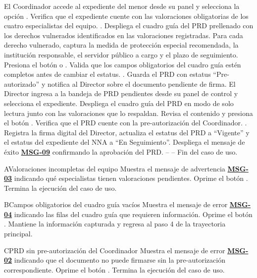 \begin{UCtrayectoria}
	\UCpaso[\UCactor] El Coordinador accede al expediente del menor desde su panel y selecciona la opción .
	\UCpaso Verifica que el expediente cuente con las valoraciones obligatorias de los cuatro especialistas del equipo. .
	\UCpaso Despliega el cuadro guía del PRD prellenado con los derechos vulnerados identificados en las valoraciones registradas.
	\UCpaso[\UCactor] Para cada derecho vulnerado, captura la medida de protección especial recomendada, la institución responsable, el servidor público a cargo y el plazo de seguimiento.
	\UCpaso[\UCactor] Presiona el botón  o .
	\UCpaso Valida que los campos obligatorios del cuadro guía estén completos antes de cambiar el estatus. .
	\UCpaso Guarda el PRD con estatus ``Pre-autorizado'' y notifica al Director sobre el documento pendiente de firma.
	\UCpaso[\UCactor] El Director ingresa a la bandeja de PRD pendientes desde su panel de control y selecciona el expediente.
	\UCpaso Despliega el cuadro guía del PRD en modo de solo lectura junto con las valoraciones que lo respaldan.
	\UCpaso[\UCactor] Revisa el contenido y presiona el botón .
	\UCpaso Verifica que el PRD cuente con la pre-autorización del Coordinador. .
	\UCpaso Registra la firma digital del Director, actualiza el estatus del PRD a ``Vigente'' y el estatus del expediente del NNA a ``En Seguimiento''.
	\UCpaso Despliega el mensaje de éxito \hyperlink{mMSG09}{\bf MSG-09} confirmando la aprobación del PRD.
	\UCpaso[] -- -- Fin del caso de uso.
\end{UCtrayectoria}

\begin{UCtrayectoriaA}{A}{Valoraciones incompletas del equipo}
	\UCpaso Muestra el mensaje de advertencia \hyperlink{mMSG03}{\bf MSG-03} indicando qué especialistas tienen valoraciones pendientes.
	\UCpaso[\UCactor] Oprime el botón .
	\UCpaso Termina la ejecución del caso de uso.
\end{UCtrayectoriaA}

\begin{UCtrayectoriaA}{B}{Campos obligatorios del cuadro guía vacíos}
	\UCpaso Muestra el mensaje de error \hyperlink{mMSG04}{\bf MSG-04} indicando las filas del cuadro guía que requieren información.
	\UCpaso[\UCactor] Oprime el botón .
	\UCpaso Mantiene la información capturada y regresa al paso 4 de la trayectoria principal.
\end{UCtrayectoriaA}

\begin{UCtrayectoriaA}{C}{PRD sin pre-autorización del Coordinador}
	\UCpaso Muestra el mensaje de error \hyperlink{mMSG02}{\bf MSG-02} indicando que el documento no puede firmarse sin la pre-autorización correspondiente.
	\UCpaso[\UCactor] Oprime el botón .
	\UCpaso Termina la ejecución del caso de uso.
\end{UCtrayectoriaA}
